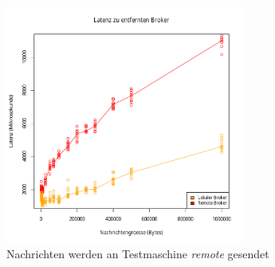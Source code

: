 \begin{figure}
\center
  \includegraphics[width=0.7\textwidth]{images/measurement/rate-limit-1-AvsB.pdf}
  \caption{Nachrichten werden an Testmaschine \textit{remote} gesendet}
  \label{img:senderate1-B}
\end{figure}

